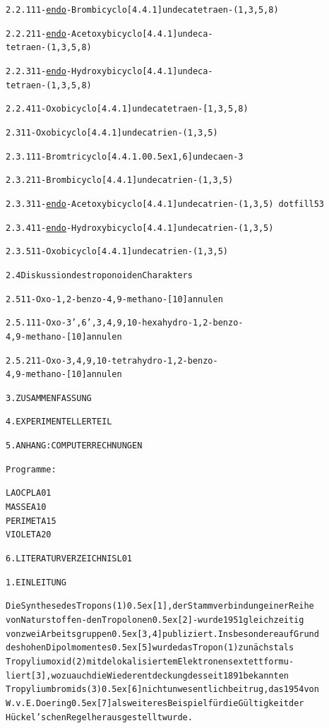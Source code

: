 \documentclass[a4paper,11pt]{article}
\begin{document}
\begin{alltt}
     2.2.1  11-\underline{endo}-Brombicyclo[4.4.1]undecatetraen-(1‚3,5,8)
\newpage
{}


     2.2.2  11-\underline{endo}-Acetoxybicyclo[4.4.1]undeca-
            tetraen-(1, 3, 5 ‚8) 

     2.2.3  11-\underline{endo}-Hydroxybicyclo[4.4.1]undeca-
             tetraen-(1‚3,5,8) 

     2.2.4  11-Oxobicyclo[4.4.1]undecatetraen-[1,3,5‚8) 

2.3  11-Oxobicyclo[4.4.1]undecatrien-(1‚3,5) 

     2.3.1  11-Bromtricyclo[4.4.1.0\raise0.5ex\hbox{1,6}]undecaen-3

     2.3.2  11-Brombicyclo[4.4.1]undecatrien-(1‚3,5) 

     2.3.3  11-\underline{endo}-Acetoxybicyclo[4.4.1]undecatrien-(1‚3,5)\ dotfill 53

     2.3.4  11-\underline{endo}-Hydroxybicyclo[4.4.1]undecatrien-(1‚3,5) 

     2.3.5  11-Oxobicyclo[4.4.1]undecatrien-(1‚3,5)

2.4   Diskussion des troponoiden Charakters

2.5  11-Oxo-1,2-benzo-4,9-methano-[10]annulen 

     2.5.1 11-Oxo-3'‚6'‚3,4,9,10-hexahydro-1,2-benzo-
             4,9-methano-[10]annulen 

     2.5.2 11-Oxo-3,4,9‚10-tetrahydro-1,2-benzo-
             4,9-methano-[10]annulen 


3. ZUSAMMENFASSUNG 

4. EXPERIMENTELLER TEIL 

5. ANHANG: COMPUTERRECHNUNGEN 

    Programme:

    LAOCPL \dotfill A 01
    MASSE \dotfill A 10
    PERIMET \dotfill A 15
    VIOLET \dotfill A 20

6. LITERATURVERZEICHNIS \dotfill L 01
\newpage
\onehalfspacing
{}


1. EINLEITUNG

Die Synthese des Tropons (1) \raise0.5ex\hbox{[1]}, der Stammverbindung einer Reihe
von Naturstoffen - den Tropolonen \raise0.5ex\hbox{[2]} - wurde 1951 gleichzeitig
von zwei Arbeitsgruppen \raise0.5ex\hbox{[3,4]} publiziert. Insbesondere auf Grund
des hohen Dipolmomentes \raise0.5ex\hbox{[5]} wurde das Tropon (1) zunächst als
Tropyliumoxid (2) mit delokalisiertem Elektronensextett formu-
liert [3], wozu auch die Wiederentdeckung des seit 1891 bekannten
Tropyliumbromids (3) \raise0.5ex\hbox{[6]} nicht unwesentlich beitrug, das 1954 von
W. v. E. Doering \raise0.5ex\hbox{[7]} als weiteres Beispiel für die Gültigkeit der
Hückel'schen Regel herausgestellt wurde.
\end{alltt}
\end{document}

